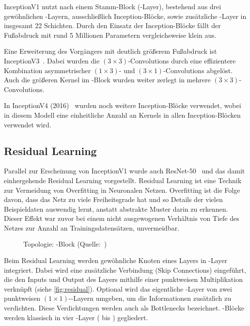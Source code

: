 InceptionV1 nutzt nach einem Stamm-Block (\stem-Layer), bestehend aus drei gewöhnlichen \conv-Layern, ausschließlich Inception-Blöcke, sowie zusätzliche \pool-Layer in insgesamt 22 Schichten.
Durch den Einsatz der Inception-Blöcke fällt der Fußabdruck mit rund 5 Millionen Parametern vergleichsweise klein aus.

Eine Erweiterung des Vorgängers mit deutlich größerem Fußabdruck ist InceptionV3~\cite{Szegedy15}.
Dabei wurden die $(3 \times 3)$-Convolutions durch eine effizientere Kombination asymmetrischer $(1 \times 3)$- und $(3 \times 1)$-Convolutions abgelöst.
Auch die größeren Kernel im \stem-Block wurden weiter zerlegt in mehrere $(3 \times 3)$-Convolutions.

In InceptionV4 (2016)~\cite{Szegedy16} wurden noch weitere Inception-Blöcke verwendet, wobei in diesem Modell eine einheitliche Anzahl an Kernels in allen Inception-Blöcken verwendet wird.

\subsection{Residual Learning}
\label{subsec:residual-learning}

Parallel zur Erscheinung von InceptionV1 wurde auch ResNet-50~\cite{He15} und das damit einhergehende Residual Learning vorgestellt.
Residual Learning ist eine Technik zur Vermeidung von Overfitting in Neuronalen Netzen.
Overfitting ist die Folge davon, dass das Netz zu viele Freiheitsgrade hat und so Details der vielen Beispieldaten auswendig lernt, anstatt abstrakte Muster darin zu erkennen.
Dieser Effekt war zuvor bei einem nicht ausgewogenen Verhältnis von Tiefe des Netzes zur Anzahl an Trainingsdatensätzen, unvermeidbar.

\begin{figure}[hb!]
    \centering
    \caption{Topologie: \res-Block (Quelle:~\cite{Karim19})}
    \label{fig:residual}
\end{figure}

Beim Residual Learning werden gewöhnliche Knoten eines Layers in \res-Layer integriert.
Dabei wird eine zusätzliche Verbindung (Skip Connections) eingeführt, die den Inputs und Output des Layers mithilfe einer punktweisen Multiplikation verknüpft (siehe \autoref{fig:residual}).
Optional wird das eigentliche \conv-Layer von zwei punktweisen $(1 \times 1)$-\conv-Layern umgeben, um die Informationen zusätzlich zu verdichten.
Diese Verdichtungen werden auch als Bottlenecks bezeichnet.
\res-Blöcke werden klassisch in vier \res-Layer ( bis ) gegliedert.

